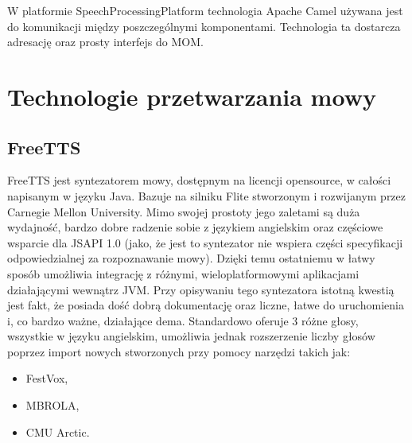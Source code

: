 W platformie SpeechProcessingPlatform technologia Apache Camel używana jest do komunikacji między poszczególnymi komponentami. Technologia ta dostarcza adresację oraz prosty interfejs do MOM.
	
\section{Technologie przetwarzania mowy}		
\subsection{FreeTTS}
FreeTTS \cite{freettssite} jest syntezatorem mowy, dostępnym na licencji opensource, w całości napisanym w języku Java. Bazuje na silniku Flite stworzonym i rozwijanym przez Carnegie Mellon University. Mimo swojej prostoty jego zaletami są duża wydajność, bardzo dobre radzenie sobie z językiem angielskim oraz częściowe wsparcie dla JSAPI 1.0 (jako, że jest to syntezator nie wspiera części specyfikacji odpowiedzialnej za rozpoznawanie mowy). Dzięki temu ostatniemu w łatwy sposób umożliwia integrację z różnymi, wieloplatformowymi aplikacjami działającymi wewnątrz JVM. Przy opisywaniu tego syntezatora istotną kwestią jest fakt, że posiada dość dobrą dokumentację oraz liczne, łatwe do uruchomienia i, co bardzo ważne, działające dema. Standardowo oferuje 3 różne głosy, wszystkie w języku angielskim, umożliwia jednak rozszerzenie liczby głosów poprzez import nowych stworzonych przy pomocy narzędzi takich jak:
\begin{itemize}
	\item FestVox,
	\item MBROLA,
	\item CMU Arctic.
\end{itemize}    

